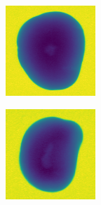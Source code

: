 \documentclass[11pt]{article}
\begin{document}
\begin{figure}[!h]
\begin{subfigure}[b]{0.22\textwidth}
         \caption{}
         \label{fig:hollow_25}
     \end{subfigure}
     \hfill
     \begin{subfigure}[b]{0.22\textwidth}
         \centering
         \includegraphics[width=\textwidth]{figurer/potato_dataset/hollow/hollow_26.jpg}
         \caption{}
         \label{fig:hollow_26}
     \end{subfigure}
     \hfill
     \begin{subfigure}[b]{0.22\textwidth}
         \centering
         \includegraphics[width=\textwidth]{figurer/potato_dataset/hollow/hollow_27.jpg}

\end{subfigure}
\end{figure}
\end{document}

